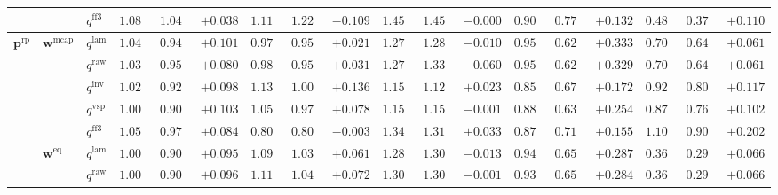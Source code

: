 \documentclass{article}
\begin{document}
\begin{table}[!htbp]
{\begin{tabular}{lll ccc ccc ccc ccc ccc}
 &  & $q^{\mathrm{ff3}}$ & $1.081$ & $1.043$ & \cellcolor{posgreen!50}$+0.038$ & $1.116$ & $1.225$ & \cellcolor{negred!50}$-0.109$ & $1.453$ & $1.454$ & $-0.000$ & $0.908$ & $0.776$ & \cellcolor{posgreen!50}$+0.132$ & $0.484$ & $0.374$ & \cellcolor{posgreen!50}$+0.110$ \\
\midrule
$\mathbf{p}^{\mathrm{rp}}$ & $\mathbf{w}^{\mathrm{mcap}}$ & $q^{\mathrm{lam}}$ & $1.042$ & $0.940$ & \cellcolor{posgreen!50}$+0.101$ & $0.977$ & $0.956$ & \cellcolor{posgreen!50}$+0.021$ & $1.275$ & $1.285$ & \cellcolor{negred!50}$-0.010$ & $0.953$ & $0.620$ & \cellcolor{posgreen!50}$+0.333$ & $0.709$ & $0.647$ & \cellcolor{posgreen!50}$+0.061$ \\
 &  & $q^{\mathrm{raw}}$ & $1.036$ & $0.956$ & \cellcolor{posgreen!50}$+0.080$ & $0.986$ & $0.955$ & \cellcolor{posgreen!50}$+0.031$ & $1.270$ & $1.330$ & \cellcolor{negred!50}$-0.060$ & $0.951$ & $0.621$ & \cellcolor{posgreen!50}$+0.329$ & $0.709$ & $0.647$ & \cellcolor{posgreen!50}$+0.061$ \\
 &  & $q^{\mathrm{inv}}$ & $1.020$ & $0.922$ & \cellcolor{posgreen!50}$+0.098$ & $1.137$ & $1.001$ & \cellcolor{posgreen!50}$+0.136$ & $1.151$ & $1.129$ & \cellcolor{posgreen!50}$+0.023$ & $0.852$ & $0.679$ & \cellcolor{posgreen!50}$+0.172$ & $0.926$ & $0.808$ & \cellcolor{posgreen!50}$+0.117$ \\
 &  & $q^{\mathrm{vsp}}$ & $1.009$ & $0.906$ & \cellcolor{posgreen!50}$+0.103$ & $1.055$ & $0.977$ & \cellcolor{posgreen!50}$+0.078$ & $1.150$ & $1.151$ & \cellcolor{negred!50}$-0.001$ & $0.884$ & $0.631$ & \cellcolor{posgreen!50}$+0.254$ & $0.871$ & $0.769$ & \cellcolor{posgreen!50}$+0.102$ \\
 &  & $q^{\mathrm{ff3}}$ & $1.054$ & $0.970$ & \cellcolor{posgreen!50}$+0.084$ & $0.806$ & $0.809$ & \cellcolor{negred!50}$-0.003$ & $1.344$ & $1.311$ & \cellcolor{posgreen!50}$+0.033$ & $0.870$ & $0.714$ & \cellcolor{posgreen!50}$+0.155$ & $1.102$ & $0.900$ & \cellcolor{posgreen!50}$+0.202$ \\
\cmidrule(lr){2-18}
 & $\mathbf{w}^{\mathrm{eq}}$ & $q^{\mathrm{lam}}$ & $1.003$ & $0.908$ & \cellcolor{posgreen!50}$+0.095$ & $1.098$ & $1.038$ & \cellcolor{posgreen!50}$+0.061$ & $1.289$ & $1.302$ & \cellcolor{negred!50}$-0.013$ & $0.941$ & $0.654$ & \cellcolor{posgreen!50}$+0.287$ & $0.363$ & $0.297$ & \cellcolor{posgreen!50}$+0.066$ \\
 &  & $q^{\mathrm{raw}}$ & $1.005$ & $0.909$ & \cellcolor{posgreen!50}$+0.096$ & $1.114$ & $1.042$ & \cellcolor{posgreen!50}$+0.072$ & $1.306$ & $1.307$ & \cellcolor{negred!50}$-0.001$ & $0.938$ & $0.654$ & \cellcolor{posgreen!50}$+0.284$ & $0.363$ & $0.297$ & \cellcolor{posgreen!50}$+0.066$ \\

\end{tabular}}
\end{table}
\end{document}
